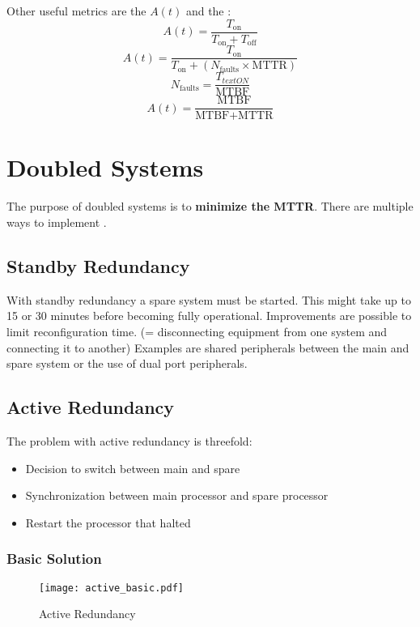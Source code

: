 \documentclass[../main.tex]{subfiles}
\begin{document}
Other useful metrics are the  $A(t)$ and the :
\[
A(t) = \frac{T_{\text{on}}}{T_{\text{on}} + T_{\text{off}}}
\]
\[
A(t) = \frac{T_{\text{on}}}{T_{\text{on}} + (N_{\text{faults}} \times \text{MTTR})}
\]
\[
N_{\text{faults}} = \frac{T_{text{ON}}}{\text{MTBF}}
\]
\[
A(t) = \frac{\text{MTBF}}{\text{MTBF} + \text{MTTR}}
\]
\section{Doubled Systems}
The purpose of doubled systems is to \textbf{minimize the MTTR}. There are multiple ways to implement .

\subsection{Standby Redundancy}
With standby redundancy a spare system must be started. This might take up to 15 or 30 minutes before becoming fully operational. Improvements are possible to limit reconfiguration time. (= disconnecting equipment from one system and connecting it to another) Examples are shared peripherals between the main and spare system or the use of dual port peripherals.

\subsection{Active Redundancy}
The problem with active redundancy is threefold:
\begin{itemize}
	\item Decision to switch between main and spare
	\item Synchronization between main processor and spare processor
	\item Restart the processor that halted
\end{itemize}



\subsubsection{Basic Solution}
\begin{figure}[h!]
    \centering
    \texttt{[image: active\_basic.pdf]}
    \caption{Active Redundancy}
    \label{acre}
\end{figure}
\end{document}
